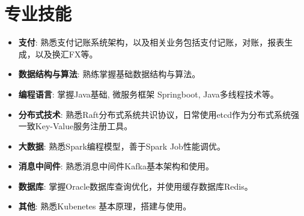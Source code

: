 \documentclass{resume}
\begin{document}



\section{专业技能}
\begin{itemize}[parsep=0.2ex]
  \item \textbf{支付}: 熟悉支付记账系统架构，以及相关业务包括支付记账，对账，报表生成，以及换汇FX等。
  \item \textbf{数据结构与算法}: 熟练掌握基础数据结构与算法。
  \item \textbf{编程语言}: 掌握Java基础, 微服务框架 Springboot, Java多线程技术等。
  \item \textbf{分布式技术}: 熟悉Raft分布式系统共识协议，日常使用etcd作为分布式系统强一致Key-Value服务注册工具。
  \item \textbf{大数据}: 熟悉Spark编程模型，善于Spark Job性能调优。
  \item \textbf{消息中间件}: 熟悉消息中间件Kafka基本架构和使用。
  \item \textbf{数据库}: 掌握Oracle数据库查询优化，并使用缓存数据库Redis。
  \item \textbf{其他}: 熟悉Kubenetes 基本原理，搭建与使用。
\end{itemize}
\end{document}
